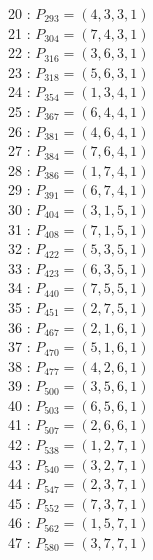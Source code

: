 \documentclass{article}
\begin{document}
{\begin{multicols}{2}
20 : $P_{293}=( 4, 3, 3, 1 )$\\
21 : $P_{304}=( 7, 4, 3, 1 )$\\
22 : $P_{316}=( 3, 6, 3, 1 )$\\
23 : $P_{318}=( 5, 6, 3, 1 )$\\
24 : $P_{354}=( 1, 3, 4, 1 )$\\
25 : $P_{367}=( 6, 4, 4, 1 )$\\
26 : $P_{381}=( 4, 6, 4, 1 )$\\
27 : $P_{384}=( 7, 6, 4, 1 )$\\
28 : $P_{386}=( 1, 7, 4, 1 )$\\
29 : $P_{391}=( 6, 7, 4, 1 )$\\
30 : $P_{404}=( 3, 1, 5, 1 )$\\
31 : $P_{408}=( 7, 1, 5, 1 )$\\
32 : $P_{422}=( 5, 3, 5, 1 )$\\
33 : $P_{423}=( 6, 3, 5, 1 )$\\
34 : $P_{440}=( 7, 5, 5, 1 )$\\
35 : $P_{451}=( 2, 7, 5, 1 )$\\
36 : $P_{467}=( 2, 1, 6, 1 )$\\
37 : $P_{470}=( 5, 1, 6, 1 )$\\
38 : $P_{477}=( 4, 2, 6, 1 )$\\
39 : $P_{500}=( 3, 5, 6, 1 )$\\
40 : $P_{503}=( 6, 5, 6, 1 )$\\
41 : $P_{507}=( 2, 6, 6, 1 )$\\
42 : $P_{538}=( 1, 2, 7, 1 )$\\
43 : $P_{540}=( 3, 2, 7, 1 )$\\
44 : $P_{547}=( 2, 3, 7, 1 )$\\
45 : $P_{552}=( 7, 3, 7, 1 )$\\
46 : $P_{562}=( 1, 5, 7, 1 )$\\
47 : $P_{580}=( 3, 7, 7, 1 )$\\
\end{multicols}
}
\end{document}
